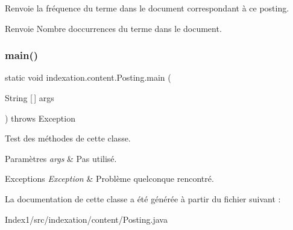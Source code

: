 Renvoie la fréquence du terme dans le document correspondant à ce posting.

\begin{DoxyReturn}{Renvoie}
Nombre d\textquotesingle{}occurrences du terme dans le document. 
\end{DoxyReturn}
\mbox{\label{classindexation_1_1content_1_1Posting_ac2aea89ea4c889116561a86b6aa0a11b}} 
\subsubsection{\texorpdfstring{main()}{main()}}
{\footnotesize\ttfamily static void indexation.\+content.\+Posting.\+main (\begin{DoxyParamCaption}\item[{String \mbox{[}$\,$\mbox{]}}]{args }\end{DoxyParamCaption}) throws Exception\hspace{0.3cm}{\ttfamily [static]}}

Test des méthodes de cette classe.


\begin{DoxyParams}{Paramètres}
{\em args} & Pas utilisé.\\
\hline
\end{DoxyParams}

\begin{DoxyExceptions}{Exceptions}
{\em Exception} & Problème quelconque rencontré. \\
\hline
\end{DoxyExceptions}


La documentation de cette classe a été générée à partir du fichier suivant \+:\begin{DoxyCompactItemize}
\item 
Index1/src/indexation/content/Posting.\+java\end{DoxyCompactItemize}
